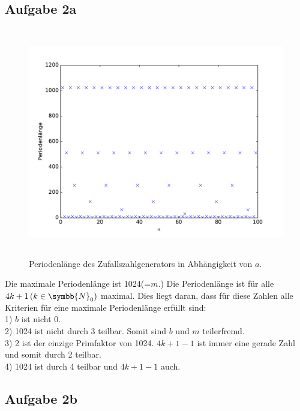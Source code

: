 \documentclass[
  bibliography=totoc,     %
  captions=tableheading,  %
  titlepage=firstiscover, %
]{scrartcl}
\begin{document}
    \subsection{Aufgabe 2a}

    \begin{figure}[H]
      \centering
      \includegraphics[height=10cm]{aPerioden.pdf}
      \caption{Periodenlänge des Zufallszahlgenerators in Abhängigkeit von $a$.}
      \label{fig:perioden}
    \end{figure}

    Die maximale Periodenlänge ist 1024(=$m.$) Die Periodenlänge ist für alle
    $4k+1\,(k\in\symbb{N}_0)$ maximal. Dies liegt daran, dass für diese Zahlen
    alle Kriterien für eine maximale Periodenlänge erfüllt sind:\\
    1) $b$ ist nicht 0.\\
    2) 1024 ist nicht durch 3 teilbar. Somit sind $b$ und $m$ teilerfremd.\\
    3) 2 ist der einzige Primfaktor von 1024. $4k+1-1$ ist immer eine gerade
    Zahl und somit durch 2 teilbar.\\
    4) 1024 ist durch 4 teilbar und $4k+1-1$ auch.\\

    \subsection{Aufgabe 2b}
\end{document}
